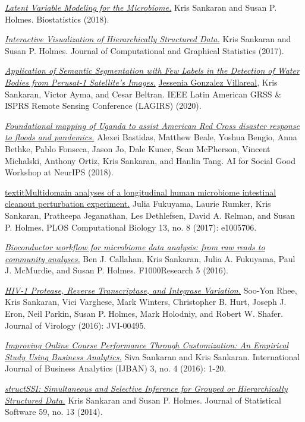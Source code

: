 \documentclass[letterpaper]{article}
\renewenvironment{itemize}{
  \begin{list}{}{
    \setlength{\leftmargin}{1.5em}
  }
}{
  \end{list}
}
\begin{document}
\begin{itemize}
  \item \href{https://doi.org/10.1093/biostatistics/kxy018}{\textit{Latent Variable Modeling for the Microbiome.}} Kris Sankaran and Susan P. Holmes. Biostatistics (2018).  
  \item \href{https://doi.org/10.1080/10618600.2017.1392866}{\textit{Interactive Visualization of Hierarchically Structured Data.}} Kris Sankaran and Susan P. Holmes. Journal of Computational and Graphical Statistics (2017).  
  \item \href{https://ieeexplore.ieee.org/document/9165643/}{\textit{Application of Semantic Segmentation with Few Labels in the Detection of Water Bodies from Perusat-1 Satellite's Images.}} \underline{Jessenia Gonzalez Villareal}, Kris Sankaran, Victor Ayma, and Cesar Beltran. IEEE Latin American GRSS \& ISPRS Remote Sensing Conference (LAGIRS) (2020).  
  \item \href{https://aiforsocialgood.github.io/2018/pdfs/track2/81_aisg_neurips2018.pdf}{\textit{Foundational mapping of Uganda to assist American Red Cross disaster response to floods and pandemics.}} Alexei Bastidas, Matthew Beale, Yoshua Bengio, Anna Bethke, Pablo Fonseca, Jason Jo, Dale Kunce, Sean McPherson, Vincent Michalski, Anthony Ortiz, Kris Sankaran, and Hanlin Tang. AI for Social Good Workshop at NeurIPS (2018).  
  \item \href{https://doi.org/10.1371/journal.pcbi.1005706 }{textit{Multidomain analyses of a longitudinal human microbiome intestinal cleanout perturbation experiment.}} Julia Fukuyama, Laurie Rumker, Kris Sankaran, Pratheepa Jeganathan, Les Dethlefsen, David A. Relman, and Susan P. Holmes. PLOS Computational Biology 13, no. 8 (2017): e1005706.  
  \item \href{https://doi.org/10.12688/f1000research.8986.2}{\textit{Bioconductor workflow for microbiome data analysis: from raw reads to community analyses.}} Ben J. Callahan, Kris Sankaran, Julia A. Fukuyama, Paul J. McMurdie, and Susan P. Holmes. F1000Research 5 (2016).  
  \item \href{https://doi.org/10.1128/jvi.00495-16}{\textit{HIV-1 Protease, Reverse Transcriptase, and Integrase Variation.}} Soo-Yon Rhee, Kris Sankaran, Vici Varghese, Mark Winters, Christopher B. Hurt, Joseph J. Eron, Neil Parkin, Susan P. Holmes, Mark Holodniy, and Robert W. Shafer. Journal of Virology (2016): JVI-00495.  
  \item \href{https://www.igi-global.com/chapter/improving-online-course-performance-through-customization/183535}{\textit{Improving Online Course Performance Through Customization: An Empirical Study Using Business Analytics.}} Siva Sankaran and Kris Sankaran. International Journal of Business Analytics (IJBAN) 3, no. 4 (2016): 1-20.  
  \item \href{https://doi.org/10.18637/jss.v059.i13}{\textit{structSSI: Simultaneous and Selective Inference for Grouped or Hierarchically Structured Data.}} Kris Sankaran and Susan P. Holmes. Journal of Statistical Software 59, no. 13 (2014).  
\end{itemize}
\end{document}
